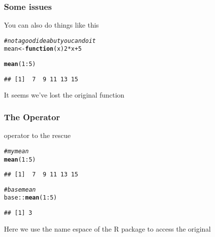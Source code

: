 \documentclass[12pt]{beamer}\usepackage[]{graphicx}\usepackage[]{color}
\makeatletter
\newcommand{\hlnum}[1]{\textcolor[rgb]{0.686,0.059,0.569}{#1}}%
\newcommand{\hlcom}[1]{\textcolor[rgb]{0.678,0.584,0.686}{\textit{#1}}}%
\newcommand{\hlopt}[1]{\textcolor[rgb]{0,0,0}{#1}}%
\newcommand{\hlstd}[1]{\textcolor[rgb]{0.345,0.345,0.345}{#1}}%
\newcommand{\hlkwa}[1]{\textcolor[rgb]{0.161,0.373,0.58}{\textbf{#1}}}%
\newcommand{\hlkwb}[1]{\textcolor[rgb]{0.69,0.353,0.396}{#1}}%
\newcommand{\hlkwc}[1]{\textcolor[rgb]{0.333,0.667,0.333}{#1}}%
\newcommand{\hlkwd}[1]{\textcolor[rgb]{0.737,0.353,0.396}{\textbf{#1}}}%
\newenvironment{kframe}{%
 \def\at@end@of@kframe{}%
 \ifinner\ifhmode%
  \def\at@end@of@kframe{\end{minipage}}%
  \begin{minipage}{\columnwidth}%
 \fi\fi%
 \def\FrameCommand##1{\hskip\@totalleftmargin \hskip-\fboxsep
 \colorbox{shadecolor}{##1}\hskip-\fboxsep
     \hskip-\linewidth \hskip-\@totalleftmargin \hskip\columnwidth}%
 \MakeFramed {\advance\hsize-\width
   \@totalleftmargin\z@ \linewidth\hsize
   \@setminipage}}%
 {\par\unskip\endMakeFramed%
 \at@end@of@kframe}
\newenvironment{knitrout}{}{} %
\makeatother
\begin{document}
\begin{frame}[fragile]
\frametitle{Some issues}

You can also do things like this
\begin{knitrout}\footnotesize
{}\color{fgcolor}\begin{kframe}
\begin{alltt}
\hlcom{# not a good idea but you can do it}
\hlstd{mean} \hlkwb{<-} \hlkwa{function}\hlstd{(}\hlkwc{x}\hlstd{)} \hlnum{2}\hlopt{*}\hlstd{x} \hlopt{+} \hlnum{5}

\hlkwd{mean}\hlstd{(}\hlnum{1}\hlopt{:}\hlnum{5}\hlstd{)}
\end{alltt}
\begin{verbatim}
## [1]  7  9 11 13 15
\end{verbatim}
\end{kframe}
\end{knitrout}

It seems we've lost the original  function

\end{frame}


\begin{frame}[fragile]
\frametitle{The \code{::} Operator}

\code{::} operator to the rescue
\begin{knitrout}\footnotesize
{}\color{fgcolor}\begin{kframe}
\begin{alltt}
\hlcom{# my mean}
\hlkwd{mean}\hlstd{(}\hlnum{1}\hlopt{:}\hlnum{5}\hlstd{)}
\end{alltt}
\begin{verbatim}
## [1]  7  9 11 13 15
\end{verbatim}
\begin{alltt}
\hlcom{# base mean}
\hlstd{base}\hlopt{::}\hlkwd{mean}\hlstd{(}\hlnum{1}\hlopt{:}\hlnum{5}\hlstd{)}
\end{alltt}
\begin{verbatim}
## [1] 3
\end{verbatim}
\end{kframe}
\end{knitrout}

Here we use the name espace  of the R package  to access the original 

\end{frame}
\end{document}

